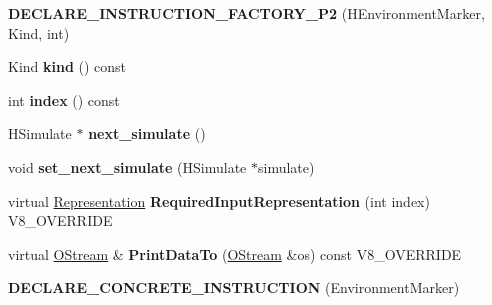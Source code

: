 \begin{DoxyCompactItemize}
\item 
\hypertarget{classv8_1_1internal_1_1_v8___f_i_n_a_l_af7a070f156f72bf2ce1def4891024a98}{}{\bfseries D\+E\+C\+L\+A\+R\+E\+\_\+\+I\+N\+S\+T\+R\+U\+C\+T\+I\+O\+N\+\_\+\+F\+A\+C\+T\+O\+R\+Y\+\_\+\+P2} (H\+Environment\+Marker, Kind, int)\label{classv8_1_1internal_1_1_v8___f_i_n_a_l_af7a070f156f72bf2ce1def4891024a98}

\item 
\hypertarget{classv8_1_1internal_1_1_v8___f_i_n_a_l_ab2a7cb87b59cd2739f2c52dcac1d3259}{}Kind {\bfseries kind} () const \label{classv8_1_1internal_1_1_v8___f_i_n_a_l_ab2a7cb87b59cd2739f2c52dcac1d3259}

\item 
\hypertarget{classv8_1_1internal_1_1_v8___f_i_n_a_l_a3ba43be9bf0c0469f6826154100119b3}{}int {\bfseries index} () const \label{classv8_1_1internal_1_1_v8___f_i_n_a_l_a3ba43be9bf0c0469f6826154100119b3}

\item 
\hypertarget{classv8_1_1internal_1_1_v8___f_i_n_a_l_afaca0023019f83efe84eb6e87b79f6e2}{}H\+Simulate $\ast$ {\bfseries next\+\_\+simulate} ()\label{classv8_1_1internal_1_1_v8___f_i_n_a_l_afaca0023019f83efe84eb6e87b79f6e2}

\item 
\hypertarget{classv8_1_1internal_1_1_v8___f_i_n_a_l_aaac5906f7727d0872bd4563a85ac4c60}{}void {\bfseries set\+\_\+next\+\_\+simulate} (H\+Simulate $\ast$simulate)\label{classv8_1_1internal_1_1_v8___f_i_n_a_l_aaac5906f7727d0872bd4563a85ac4c60}

\item 
\hypertarget{classv8_1_1internal_1_1_v8___f_i_n_a_l_a6c6d1f37f40b113d8f4062f1ffff7215}{}virtual \hyperlink{classv8_1_1internal_1_1_representation}{Representation} {\bfseries Required\+Input\+Representation} (int index) V8\+\_\+\+O\+V\+E\+R\+R\+I\+D\+E\label{classv8_1_1internal_1_1_v8___f_i_n_a_l_a6c6d1f37f40b113d8f4062f1ffff7215}

\item 
\hypertarget{classv8_1_1internal_1_1_v8___f_i_n_a_l_ac450dad970b14246be761ccf5004924b}{}virtual \hyperlink{classv8_1_1internal_1_1_o_stream}{O\+Stream} \& {\bfseries Print\+Data\+To} (\hyperlink{classv8_1_1internal_1_1_o_stream}{O\+Stream} \&os) const V8\+\_\+\+O\+V\+E\+R\+R\+I\+D\+E\label{classv8_1_1internal_1_1_v8___f_i_n_a_l_ac450dad970b14246be761ccf5004924b}

\item 
\hypertarget{classv8_1_1internal_1_1_v8___f_i_n_a_l_a00a7f62b3117c2ca62ba3371d72efd27}{}{\bfseries D\+E\+C\+L\+A\+R\+E\+\_\+\+C\+O\+N\+C\+R\+E\+T\+E\+\_\+\+I\+N\+S\+T\+R\+U\+C\+T\+I\+O\+N} (Environment\+Marker)\label{classv8_1_1internal_1_1_v8___f_i_n_a_l_a00a7f62b3117c2ca62ba3371d72efd27}


\end{DoxyCompactItemize}
